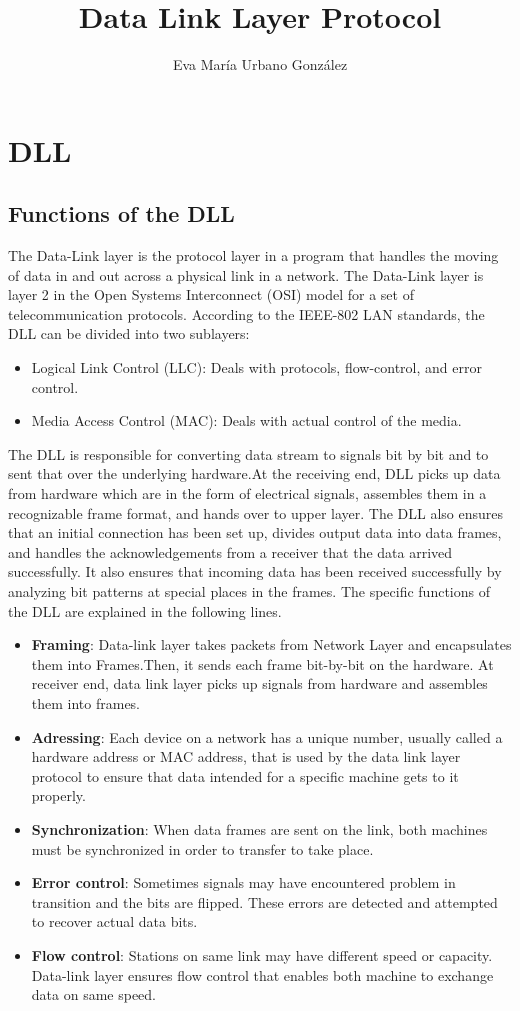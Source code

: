 \documentclass[12pt,a4paper]{report}
\author{Eva María Urbano González}
\title{Data Link Layer Protocol}
\begin{document}
\maketitle
\tableofcontents
\listoffigures
\listoftables
\chapter{DLL}
\section{Functions of the DLL}
The Data-Link layer is the protocol layer in a program that handles the moving of data in and out across a physical link in a network. The Data-Link layer is layer 2 in the Open Systems Interconnect (OSI) model for a set of telecommunication protocols. According to the IEEE-802 LAN standards, the DLL can be divided into two sublayers:
\begin{itemize}
\item Logical Link Control (LLC): Deals with protocols, flow-control, and error control.
\item Media Access Control (MAC): Deals with actual control of the media.
\end{itemize}
The DLL is responsible for converting data stream to signals bit by bit and to sent that over the underlying hardware.At the receiving end, DLL picks up data from hardware which are in the form of electrical signals, assembles them in a recognizable frame format, and hands over to upper layer. The DLL also ensures that an initial connection has been set up, divides output data into data frames, and handles the acknowledgements from a receiver that the data arrived successfully. It also ensures that incoming data has been received successfully by analyzing bit patterns at special places in the frames. The specific functions of the DLL are explained in the following lines.
\begin{itemize}
\item \textbf{Framing}: Data-link layer takes packets from Network Layer and encapsulates them into Frames.Then, it sends each frame bit-by-bit on the hardware. At receiver end, data link layer picks up signals from hardware and assembles them into frames.
\item \textbf{Adressing}: Each device on a network has a unique number, usually called a hardware address or MAC address, that is used by the data link layer protocol to ensure that data intended for a specific machine gets to it properly.
\item \textbf{Synchronization}: When data frames are sent on the link, both machines must be synchronized in order to transfer to take place.
\item \textbf{Error control}: Sometimes signals may have encountered problem in transition and the bits are flipped. These errors are detected and attempted to recover actual data bits.
\item \textbf{Flow control}: Stations on same link may have different speed or capacity. Data-link layer ensures flow control that enables both machine to exchange data on same speed. 
 \end{itemize}
\end{document}
